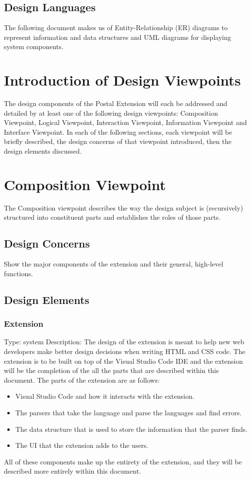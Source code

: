 \documentclass[letterpaper,10pt,titlepage,draftclsnofoot,onecolumn,onesided] {IEEEtran}
\begin{document}
\subsection{Design Languages}
The following document makes us of Entity-Relationship (ER) diagrams to represent information and data structures and UML diagrams for displaying system components. 

\section{Introduction of Design Viewpoints}
The design components of the Postal Extension will each be addressed and detailed by at least one of the following design viewpoints: Composition Viewpoint, Logical Viewpoint, Interaction Viewpoint, Information Viewpoint and Interface Viewpoint.
In each of the following sections, each viewpoint will be briefly described, the design concerns of that viewpoint introduced, then the design elements discussed.

\section{Composition Viewpoint}
The Composition viewpoint describes the way the design subject is (recursively) structured into constituent
parts and establishes the roles of those parts. 
\subsection{Design Concerns}
Show the major components of the extension and their general, high-level functions.
\subsection{Design Elements}

	\subsubsection{Extension}
	Type: system
	Description: The design of the extension is meant to help new web developers make better design decisions when writing HTML and CSS code.
	The extension is to be built on top of the Visual Studio Code IDE and the extension will be the completion of the all the parts that are described within this document. 
	The parts of the extension are as follows:
	\begin{itemize}
	\item Visual Studio Code and how it interacts with the extension.
	\item The parsers that take the language and parse the languages and find errors.
	\item The data structure that is used to store the information that the parser finds.
	\item The UI that the extension adds to the users. 
	\end{itemize}
	All of these components make up the entirety of the extension, and they will be described more entirely within this document. 
	
\end{document}
